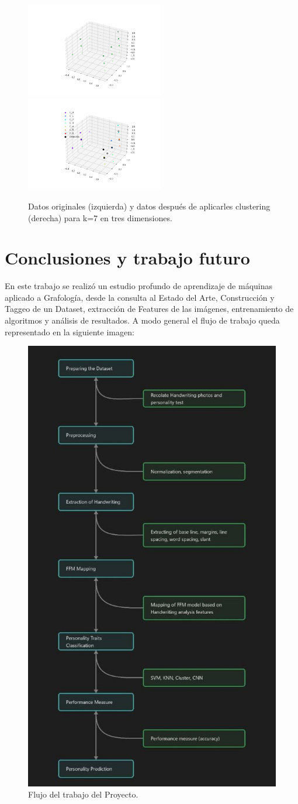 \documentclass[10pt, a4paper]{article}
\begin{document}
    	\begin{figure}[hbt!]
    		\centering
    		\includegraphics[width = 6cm]{Original_Data_3d.png}
    		\includegraphics[width = 6cm]{Clustered_Data_3d_k7_seed45.png}
    		\caption{Datos originales (izquierda) y datos despu\'es de aplicarles clustering (derecha) para k=7 en tres dimensiones.}
    	\end{figure}
    
    \newpage
    \section{Conclusiones y trabajo futuro}
        En este trabajo se realiz\'o un estudio profundo de aprendizaje de m\'aquinas aplicado a Grafolog\'ia, desde la consulta al Estado del Arte, Construcci\'on y Taggeo de un Dataset, extracci\'on de Features de las im\'agenes, entrenamiento de algoritmos y an\'alisis de resultados. A modo general el flujo de trabajo queda representado en la siguiente imagen: 

        \begin{figure}[!h]
            \centering
            \includegraphics[width = 0.5\linewidth]{photo_2023-05-29_02-40-00.jpg}
            \caption{Flujo del trabajo del Proyecto.}
        \end{figure}
\end{document}
